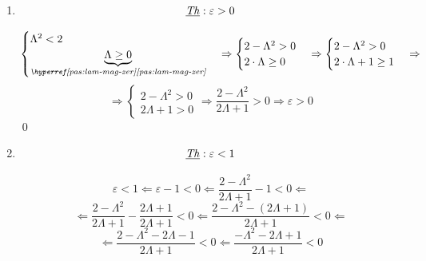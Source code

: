 \begin{enumerate}
\begin{demonstration}
\begin{enumerate}[label=(\roman*)]
\begin{enumerate}[label=\arabic*.]
\begin{enumerate}[label=\arabic{enumiii}.\arabic*.]
\[\begin{cases}
                            2 - \Lambda^2 \in \mathbb{Q} \\
                            \frac{1}{2\Lambda + 1} \in \mathbb{Q} \\
                        \end{cases}\Rightarrow
                            \left(2 - \Lambda^2\right) \frac{1}{2\Lambda + 1} \in \mathbb{Q} \Rightarrow
                            \frac{2 - \Lambda^2}{2\Lambda + 1} \in \mathbb{Q} \Rightarrow\]\[\Rightarrow
                            \varepsilon\in\mathbb{Q}
                    \]
                    \qed

                    \item
                    \[ \underbar{\textit{Th}}: \varepsilon > 0 \]
                    
                    \[
                        \begin{cases}
                            \Lambda^2 < 2 \\
                            \underbrace{\Lambda \geq 0}_{\pasref{pas:lam-mag-zer}}
                        \end{cases} \Rightarrow
                        \begin{cases}
                            2 - \Lambda^2 > 0 \\
                            2\cdot\Lambda \geq 0
                        \end{cases} \Rightarrow
                        \begin{cases}
                            2 - \Lambda^2 > 0\\
                            2\cdot\Lambda + 1 \geq 1
                        \end{cases}\Rightarrow\]\[\Rightarrow
                        \begin{cases}
                            2 - \Lambda^2 > 0\\
                            2\Lambda + 1 > 0
                        \end{cases}\Rightarrow
                        \frac{ 2 - \Lambda^2}{2\Lambda + 1}>0\Rightarrow
                        \varepsilon>0
                    \]
                    \qed

                    \item
                    \[ \underbar{\textit{Th}}: \varepsilon < 1 \]

                    \[
                        \varepsilon<1 \Leftarrow
                        \varepsilon - 1 < 0 \Leftarrow
                        \frac{2 - \Lambda^2}{2\Lambda + 1} - 1 < 0 \Leftarrow\]\[\Leftarrow
                        \frac{2 - \Lambda^2}{2\Lambda + 1} - \frac{2\Lambda + 1}{2\Lambda + 1} < 0 \Leftarrow
                        \frac{2 - \Lambda^2 - \left(2\Lambda + 1\right)}{2\Lambda + 1} < 0 \Leftarrow\]\[\Leftarrow
                        \frac{2 - \Lambda^2 - 2\Lambda - 1}{2\Lambda + 1} < 0 \Leftarrow
                        \frac{- \Lambda^2 - 2\Lambda + 1}{2\Lambda + 1} < 0
                    \]



\end{enumerate}
\end{enumerate}
\end{enumerate}
\end{demonstration}
\end{enumerate}
